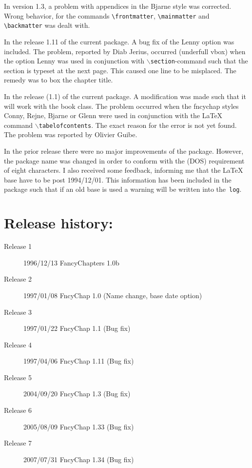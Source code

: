 \documentclass{report}
\newcommand{\A}[1]{{$\backslash$\texttt{#1}}}
\begin{document}
      In version 1.3, a problem with appendices in the Bjarne style was
      corrected. Wrong behavior, for the commands
      \verb+\frontmatter+, \verb+\mainmatter+ and  \verb+\backmatter+
      was dealt with. 

      In the release 1.11 of the current package. A bug
      fix of the Lenny option was included. The problem, reported
      by Diab Jerius, occurred (underfull vbox) when the option Lenny
      was used in conjunction with \A{section}-command such that the
      section is typeset at the next page. This caused one line to be
      misplaced. The remedy was to box the chapter title.

      In the release (1.1) of the current package. A
      modification was made such that it will work with the book
      class. The problem occurred when the fncychap styles Conny,
      Rejne, Bjarne or Glenn were used in conjunction with the
      \LaTeX{} command \A{tabelofcontents}. The exact reason for the
      error is not yet found. The problem was reported by Olivier Guibe.

      In the prior release there were no major improvements of the
      package. However, the package name was changed in order to
      conform with the (DOS) requirement of eight characters. I also
      received some feedback, informing me that the \LaTeX{} base have
      to be post 1994/12/01.  This information has been included in
      the package such that if an old base is used a warning will be
      written into the~\texttt{log}.

      \section*{Release history:}
      \begin{description}
        \item[Release 1] 1996/12/13 FancyChapters 1.0b
        \item[Release 2] 1997/01/08 FncyChap 1.0 (Name change, base
          date option)
        \item[Release 3] 1997/01/22 FncyChap 1.1 (Bug fix)
        \item[Release 4] 1997/04/06 FncyChap 1.11 (Bug fix)
        \item[Release 5] 2004/09/20 FncyChap 1.3 (Bug fix)
        \item[Release 6] 2005/08/09 FncyChap 1.33 (Bug fix)
        \item[Release 7] 2007/07/31 FncyChap 1.34 (Bug fix)
      \end{description}
\end{document}
